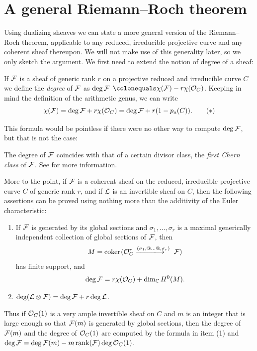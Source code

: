 \section{A general Riemann--Roch theorem}

Using 
dualizing sheaves 
%
we can state a 
more
general version of the Riemann--Roch theorem,
applicable to any reduced, irreducible projective curve and any coherent sheaf thereupon.
%
We will not make use of
this
generality
later,
so we only sketch the argument.
We first need
to extend the notion of
degree of a sheaf:

\begin{definition}
If ${\mathcal F}$ is a sheaf of generic rank $r$ on a projective reduced and
irreducible curve $C$ we define the 
%
\emph{degree}
of ${\mathcal F}$ 
as $\deg {\mathcal F}$
\unskip ${}\colonequals\chi(\sF) -r\chi(\sO_C)$.
Keeping in mind the definition of the arithmetic genus, we can write
\begin{equation}
\chi({\mathcal F}) = \deg {\mathcal F} + r\chi({\mathcal O}_C) = \deg {\mathcal F} + r(1-p_a(C)).
\tag{$*$}
\label{general RR without duality}
\end{equation}
\end{definition}

This 
formula
would be
pointless
if there were no other way to compute $\deg {\mathcal F}$, but
that is not the case:

\begin{fact} 
The degree of ${\mathcal F}$ 
coincides with that of a certain
divisor class, 
the 
\emph{first Chern class}
%
of ${\mathcal F}$. See
\cite[Chapter~5]{3264}
for more information.

More to the point,
if ${\mathcal F}$ is a coherent sheaf on 
the reduced, irreducible projective curve
$C$ of generic rank $r$, and if ${\mathcal L}$
is an invertible sheaf on $C$, then
the following assertions can be proved using nothing more than the additivity of
the Euler characteristic:
\begin{enumerate}
\def\ruuuto#1{\mathrel{\hbox{$-\mskip-8mu-\mskip-8mu-\mskip-8mu-\mskip-8mu-\mskip-8mu-\mskip-8mu\to$}%
      \kern-40pt
      \raise6pt\hbox{$\scriptstyle#1$}%
      \kern3pt}}
\item If ${\mathcal F}$ is generated by its global sections and $\sigma_1,\dots,
\sigma_r$ is a maximal generically independent
collection of global sections of ${\mathcal F}$, then $$M = \coker(\sO_C^r \ruuuto
{(\sigma_1,@\dots@, \sigma_r)}\sF)$$
has finite support, and
$$
\deg {\mathcal F} = r \chi({\mathcal O}_C)+
\dim_{\mathbb C} H^0(M).
$$

\item $\deg ({\mathcal L} \otimes {\mathcal F}) = \deg {\mathcal F} +r\deg {\mathcal L}$.
\end{enumerate}

Thus if ${\mathcal O}_C(1)$ is a 
very ample 
invertible sheaf
%
 on $C$ and $m$
is an integer that is
large 
enough so that
${\mathcal F}(m)$ is generated by global sections, then the degree of ${\mathcal F}(m)$
and the degree of ${\mathcal O}_C(1)$ are computed by the formula in item (1)
and $\deg {\mathcal F} = \deg {\mathcal F}(m) - m \operatorname{rank}({\mathcal F}) \deg  {\mathcal O}_C(1)$.
\end{fact}

